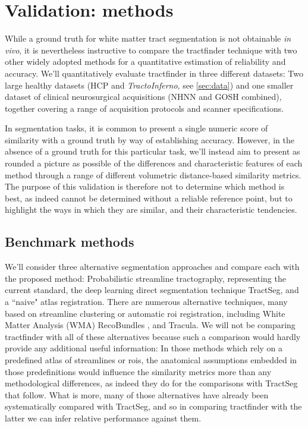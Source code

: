 
\section{Validation: methods}

While a ground truth for white matter tract segmentation is not obtainable \textit{in vivo}, it is nevertheless instructive to compare the tractfinder technique with two other widely adopted methods for a quantitative estimation of reliability and accuracy.
We'll quantitatively evaluate tractfinder in three different datasets: Two large healthy datasets (HCP and \textit{TractoInferno}, see \ref{sec:data}) and one smaller dataset of clinical neurosurgical acquisitions (NHNN and GOSH combined), together covering a range of acquisition protocols and scanner specifications.

In segmentation tasks, it is common to present a single numeric score of similarity with a ground truth by way of establishing accuracy.
However, in the absence of a ground truth for this particular task, we'll instead aim to present as rounded a picture as possible of the differences and characteristic features of each method through a range of different volumetric distance-based similarity metrics.
The purpose of this validation is therefore not to determine which method is best, as indeed cannot be determined without a reliable reference point, but to highlight the ways in which they are similar, and their characteristic tendencies.

\subsection{Benchmark methods}

We'll consider three alternative segmentation approaches and compare each with the proposed method: Probabilistic streamline tractography, representing the current standard, the deep learning direct segmentation technique TractSeg, and a ``naive" atlas registration.
There are numerous alternative techniques, many based on streamline clustering or automatic \gls{roi} registration, including White Matter Analysis (WMA)\autocite{ODonnell2017} RecoBundles \autocite{Garyfallidis2018}, and Tracula.\autocite{Yendiki2011}
We will not be comparing tractfinder with all of these alternatives because such a comparison would hardly provide any additional useful information:
In those methods which rely on a predefined atlas of streamlines or \glspl{roi}, the anatomical assumptions embedded in those predefinitions would influence the similarity metrics more than any methodological differences, as indeed they do for the comparisons with TractSeg that follow.
What is more, many of those alternatives have already been systematically compared with TractSeg\autocite{Wasserthal2018}, and so in comparing tractfinder with the latter we can infer relative performance against them.


